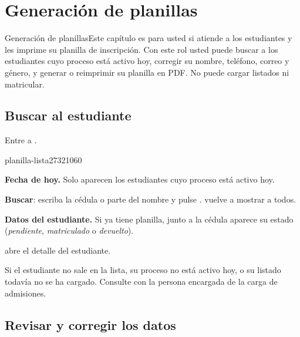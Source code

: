 \chapter{Generación de planillas}\label{cap:planillas}

\begin{ficharol}{Generación de planillas}{Este capítulo es para usted si atiende a los
  estudiantes y les imprime su planilla de inscripción.}
Con este rol usted puede buscar a los estudiantes cuyo proceso está activo hoy, corregir su
nombre, teléfono, correo y género, y generar o reimprimir su planilla en PDF. No puede cargar
listados ni matricular.
\end{ficharol}

\section{Buscar al estudiante}

Entre a .

\begin{captura}{planilla-lista}{2732}{1060}
\end{captura}

\begin{leyenda}
  \item[1] \textbf{Fecha de hoy.} Solo aparecen los estudiantes cuyo proceso está activo hoy.
  \item[2] \textbf{Buscar}: escriba la cédula o parte del nombre y pulse .
         vuelve a mostrar a todos.
  \item[3] \textbf{Datos del estudiante.} Si ya tiene planilla, junto a la cédula aparece su
        estado (\emph{pendiente}, \emph{matriculado} o \emph{devuelto}).
  \item[4]  abre el detalle del estudiante.
\end{leyenda}

\begin{nota}
Si el estudiante no sale en la lista, su proceso no está activo hoy, o su listado todavía no se
ha cargado. Consulte con la persona encargada de la carga de admisiones.
\end{nota}

\section{Revisar y corregir los datos}

